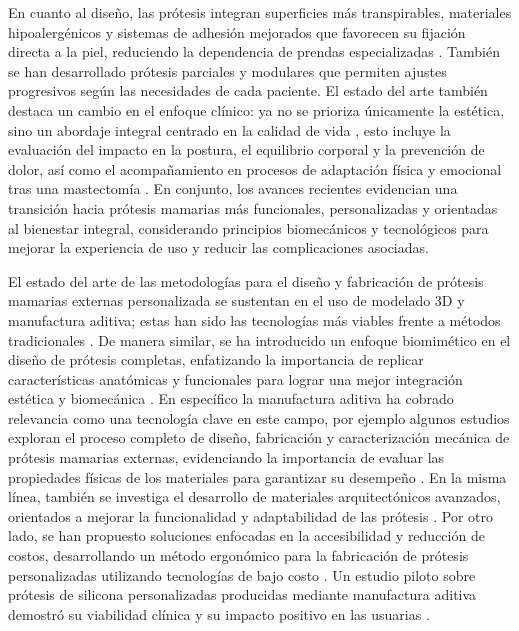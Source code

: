 \documentclass[12pt,a4paper]{article}
\begin{document}
En cuanto al diseño, las prótesis integran superficies más transpirables, materiales hipoalergénicos 
y sistemas de adhesión mejorados que favorecen su fijación directa a la piel, reduciendo la dependencia 
de prendas especializadas \cite{WHO2021}. También se han desarrollado prótesis parciales y modulares que 
permiten ajustes progresivos según las necesidades de cada paciente. El estado del arte también destaca 
un cambio en el enfoque clínico: ya no se prioriza únicamente la estética, sino un abordaje integral 
centrado en la calidad de vida \cite{casanovasprograma}, esto incluye la evaluación del impacto en la postura, 
 el equilibrio corporal y la prevención de dolor, así como el acompañamiento en procesos de adaptación física 
 y emocional tras una mastectomía \cite{McNeely2021,Hojan2016}. En conjunto, los avances recientes 
 evidencian una transición hacia prótesis mamarias más funcionales, personalizadas y orientadas 
 al bienestar integral, considerando principios biomecánicos y tecnológicos para mejorar la experiencia 
 de uso y reducir las complicaciones asociadas.


El estado del arte de las metodologías para el diseño y fabricación de prótesis mamarias externas personalizada se sustentan en el uso de modelado 3D y manufactura aditiva; estas han sido las tecnologías más viables frente a métodos tradicionales \cite{Helguero2024, montejo2020methodology}. De manera similar, se ha introducido un enfoque biomimético en el diseño de prótesis completas, enfatizando la importancia de replicar características anatómicas y funcionales para lograr una mejor integración estética y biomecánica \cite{cruz2018biomimetic}. En específico la manufactura aditiva ha cobrado relevancia como una tecnología clave en este campo, por ejemplo algunos estudios exploran el proceso completo de diseño, fabricación y caracterización mecánica de prótesis mamarias externas, evidenciando la importancia de evaluar las propiedades físicas de los materiales para garantizar su desempeño \cite{cansing2024additive}. En la misma línea, también se investiga el desarrollo de materiales arquitectónicos avanzados, orientados a mejorar la funcionalidad y adaptabilidad de las prótesis \cite{zhang2025development}. Por otro lado, se han propuesto soluciones enfocadas en la accesibilidad y reducción de costos, desarrollando  un método ergonómico para la fabricación de prótesis personalizadas utilizando tecnologías de bajo costo \cite{regina2024method}. Un estudio piloto sobre prótesis de silicona personalizadas producidas mediante manufactura aditiva demostró su viabilidad clínica y su impacto positivo en las usuarias \cite{leme2023development}.
\end{document}
